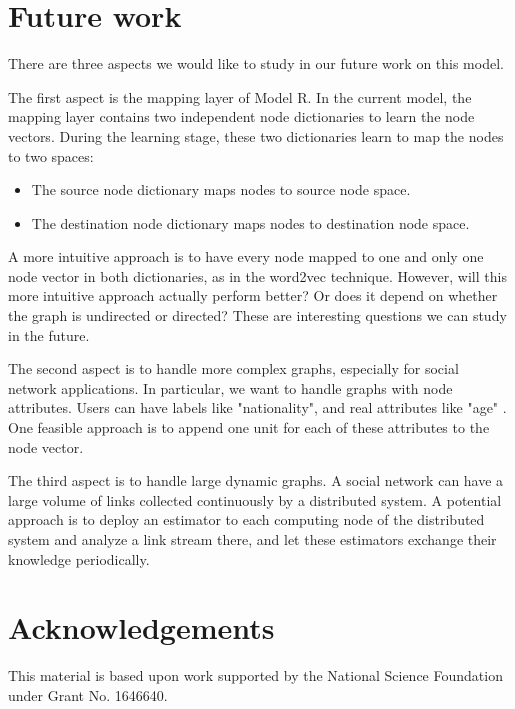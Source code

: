 \documentclass[conference]{IEEEtran}
\begin{document}
\section{Future work}
There are three aspects we would like to study in our future work on this model.

The first aspect is the mapping layer of Model R.
In the current model, the mapping layer contains two independent node dictionaries
to learn the node vectors.
During the learning stage, these two dictionaries learn to map the nodes to two spaces:
\begin{itemize}
	\item The source node dictionary maps nodes to source node space.
	\item The destination node dictionary maps nodes to destination node space.
\end{itemize}
A more intuitive approach is to have every node mapped to
one and only one node vector in both dictionaries,
as in the word2vec technique.
However, will this more intuitive approach actually perform better?
Or does it depend on whether the graph is undirected or directed?
These are interesting questions we can study in the future.

The second aspect is to handle more complex graphs,
especially for social network applications.
In particular, we want to handle graphs with node attributes.
Users can have labels like "nationality", and real attributes like "age" .
One feasible approach is to append one unit for each of these attributes to the node vector.

The third aspect is to handle large dynamic graphs.
A social network can have a large volume of links collected continuously by a
distributed system.
A potential approach is to deploy an estimator to each computing node of
the distributed system and analyze a link stream there,
and let these estimators exchange their knowledge periodically.

\section*{Acknowledgements}
This material is based upon work supported by the National Science Foundation under Grant No. 1646640.



\end{document}
